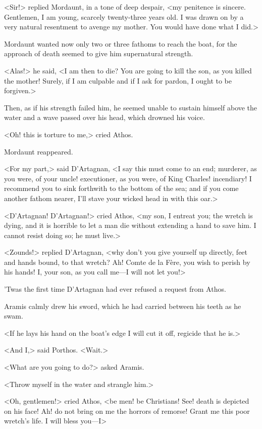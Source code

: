 <Sir!> replied Mordaunt, in a tone of deep despair, <my penitence is sincere. Gentlemen, I am young, scarcely twenty-three years old. I was drawn on by a very natural resentment to avenge my mother. You would have done what I did.>

Mordaunt wanted now only two or three fathoms to reach the boat, for the approach of death seemed to give him supernatural strength.

<Alas!> he said, <I am then to die? You are going to kill the son, as you killed the mother! Surely, if I am culpable and if I ask for pardon, I ought to be forgiven.>

Then, as if his strength failed him, he seemed unable to sustain himself above the water and a wave passed over his head, which drowned his voice.

<Oh! this is torture to me,> cried Athos.

Mordaunt reappeared.

<For my part,> said D'Artagnan, <I say this must come to an end; murderer, as you were, of your uncle! executioner, as you were, of King Charles! incendiary! I recommend you to sink forthwith to the bottom of the sea; and if you come another fathom nearer, I'll stave your wicked head in with this oar.>

<D'Artagnan! D'Artagnan!> cried Athos, <my son, I entreat you; the wretch is dying, and it is horrible to let a man die without extending a hand to save him. I cannot resist doing so; he must live.>

<Zounds!> replied D'Artagnan, <why don't you give yourself up directly, feet and hands bound, to that wretch? Ah! Comte de la Fère, you wish to perish by his hands! I, your son, as you call me—I will not let you!>

'Twas the first time D'Artagnan had ever refused a request from Athos.

Aramis calmly drew his sword, which he had carried between his teeth as he swam.

<If he lays his hand on the boat's edge I will cut it off, regicide that he is.>

<And I,> said Porthos. <Wait.>

<What are you going to do?> asked Aramis.

<Throw myself in the water and strangle him.>

<Oh, gentlemen!> cried Athos, <be men! be Christians! See! death is depicted on his face! Ah! do not bring on me the horrors of remorse! Grant me this poor wretch's life. I will bless you—I\longdash>


